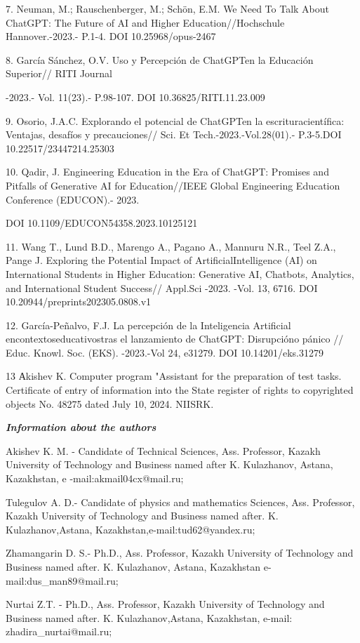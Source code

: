 7. Neuman, M.; Rauschenberger, M.; Schön, E.M. We Need To Talk About
ChatGPT: The Future of AI and Higher Education//Hochschule
Hannover.-2023.- P.1-4. DOI 10.25968/opus-2467

8. García Sánchez, O.V. Uso y Percepción de ChatGPTen la Educación
Superior// RITI Journal

-2023.- Vol. 11(23).- P.98-107. DOI 10.36825/RITI.11.23.009

9. Osorio, J.A.C. Explorando el potencial de ChatGPTen la
escrituracientífica: Ventajas, desafíos y precauciones// Sci. Et
Tech.-2023.-Vol.28(01).- P.3-5.DOI 10.22517/23447214.25303

10. Qadir, J. Engineering Education in the Era of ChatGPT: Promises and
Pitfalls of Generative AI for Education//IEEE Global Engineering
Education Conference (EDUCON).- 2023.

DOI 10.1109/EDUCON54358.2023.10125121

11. Wang T., Lund B.D., Marengo A., Pagano A., Mannuru N.R., Teel Z.A.,
Pange J. Exploring the Potential Impact of ArtificialIntelligence (AI)
on International Students in Higher Education: Generative AI, Chatbots,
Analytics, and International Student Success// Appl.Sci -2023. -Vol. 13,
6716. DOI 10.20944/preprints202305.0808.v1

12. García-Peñalvo, F.J. La percepción de la Inteligencia Artificial
encontextoseducativostras el lanzamiento de ChatGPT: Disrupcióno pánico
// Educ. Knowl. Soc. (EKS). -2023.-Vol 24, e31279. DOI
10.14201/eks.31279

13 Аkishev K. Computer program "Assistant for the preparation of test
tasks. Certificate of entry of information into the State register of
rights to copyrighted objects No. 48275 dated July 10, 2024. NIISRK.

\emph{{\bfseries Information about the authors}}

Akishev K. M. - Candidate of Technical Sciences, Ass. Professor, Kazakh
University of Technology and Business named after K. Kulazhanov, Astana,
Kazakhstan, e -mail:akmail04cx@mail.ru;

Tulegulov A. D.- Candidate of physics and mathematics Sciences, Ass.
Professor, Kazakh University of Technology and Business named after. K.
Kulazhanov,Astana, Kazakhstan,e-mail:tud62@yandex.ru;

Zhamangarin D. S.- Ph.D., Ass. Professor, Kazakh University of
Technology and Business named after. K. Kulazhanov, Astana, Kazakhstan
e-mail:dus\_man89@mail.ru;

Nurtai Z.T. - Ph.D., Ass. Professor, Kazakh University of Technology and
Business named after. K. Kulazhanov,Astana, Kazakhstan, e-mail:
zhadira\_nurtai@mail.ru;

